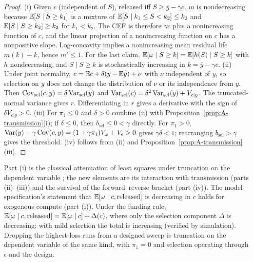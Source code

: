 \begin{proof}
(i) Given $c$ (independent of $S$), released iff $S\ge\bar y-\gamma c$. $m$ is nondecreasing because
$\mathbb{E}[S\mid S\ge k_1]$ is a mixture of $\mathbb{E}[S\mid k_1\le S<k_2]\le k_2$ and $\mathbb{E}[S\mid S\ge k_2]\ge k_2$ for $k_1<k_2$. The CEF
is therefore $\gamma c$ plus a nonincreasing function of $c$, and the linear projection of a nonincreasing function on $c$
has a nonpositive slope. Log-concavity implies a nonincreasing mean residual life $m(k)-k$, hence $m'\le1$. For the last
claim, $\mathbb{E}[\omega\mid S\ge k]=\mathbb{E}[h(S)\mid S\ge k]$ with $h$ nondecreasing, and $S\mid S\ge k$ is stochastically increasing in
$k=\bar y-\gamma c$. (ii) Under joint normality, $c=\mathbb{E} c+\delta(y-\mathbb{E} y)+\nu$ with $\nu$ independent of $y$, so selection
on $y$ does not change the distribution of $\nu$ or its independence from $y$. Then $\operatorname{Cov}_{\text{sel}}(c,y)=\delta\operatorname{Var}_{\text{sel}}(y)$
and $\operatorname{Var}_{\text{sel}}(c)=\delta^2\operatorname{Var}_{\text{sel}}(y)+V_{c|y}$. The truncated-normal variance gives $r$. Differentiating in
$r$ gives a derivative with the sign of $\delta V_{c|y}>0$. (iii) For $\pi_1\le0$ and $\delta>0$ combine (ii) with Proposition~\ref{prop:A-transmission}(i); if $\delta\le0$,
then $b_{\text{sel}}\le0<\gamma$ directly. For $\pi_1>0$, $\operatorname{Var}(y)-\gamma\operatorname{Cov}(c,y)=(1+\gamma\pi_1)V_\omega+V_\epsilon>0$ gives
$\gamma\delta<1$; rearranging $b_{\text{sel}}>\gamma$ gives the threshold. (iv) follows from (ii) and
Proposition~\ref{prop:A-transmission}(iii).
\end{proof}

\begin{remark}
Part (i) is the classical attenuation of least squares under truncation on the dependent variable
\citep{goldberger1981linear,hausman1977social}; the new elements are its interaction with transmission (parts (ii)--(iii))
and the survival of the forward--reverse bracket (part (iv)). The model specification's statement that
$\mathbb{E}[\omega\mid c,\text{released}]$ is decreasing in $c$ holds for exogenous compute (part (i)). Under the funding rule, $\mathbb{E}[\omega\mid c,\text{released}]=\mathbb{E}[\omega\mid c]+\Delta(c)$, where only the
selection component $\Delta$ is decreasing; with mild selection the total is increasing (verified by simulation).
Dropping the highest-loss runs from a designed sweep \citep{besiroglu2024chinchilla} is truncation on the dependent
variable of the same kind, with $\pi_1=0$ and selection operating through $\epsilon$ and the design.
\end{remark}

